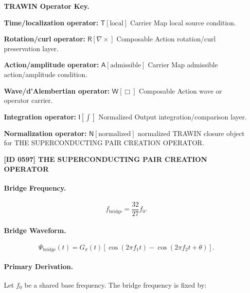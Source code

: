 \par\vspace{0.45\baselineskip}
\noindent\begin{minipage}[t]{\linewidth}
\begingroup
\small
\raggedright
\textbf{TRAWIN Operator Key.}\par
\noindent\textbf{Time/localization operator:} $\mathsf{T}\!\left[\mathrm{local}\right]$ Carrier Map local source condition.\par
\noindent\textbf{Rotation/curl operator:} $\mathsf{R}\!\left[\nabla\times\right]$ Composable Action rotation/curl preservation layer.\par
\noindent\textbf{Action/amplitude operator:} $\mathsf{A}\!\left[\mathrm{admissible}\right]$ Carrier Map admissible action/amplitude condition.\par
\noindent\textbf{Wave/d'Alembertian operator:} $\mathsf{W}\!\left[\Box\right]$ Composable Action wave or operator carrier.\par
\noindent\textbf{Integration operator:} $\mathsf{I}\!\left[\int\right]$ Normalized Output integration/comparison layer.\par
\noindent\textbf{Normalization operator:} $\mathsf{N}\!\left[\mathrm{normalized}\right]$ normalized TRAWIN closure object for THE SUPERCONDUCTING PAIR CREATION OPERATOR.\par
\endgroup
\end{minipage}

\clearpage
\noindent\textbf{[ID 0597] THE SUPERCONDUCTING PAIR CREATION OPERATOR}\par
\vspace{0.35em}
\paragraph{Bridge Frequency.}
\begin{equation}
f_{\mathrm{bridge}}=\frac{32}{27}f_0.
\end{equation}

\paragraph{Bridge Waveform.}
\begin{equation}
\Psi_{\mathrm{bridge}}(t)
=
G_{\sigma}(t)
\left[
\cos(2\pi f_1t)
-
\cos(2\pi f_2t+\theta)
\right].
\end{equation}

\paragraph{Primary Derivation.}
Let $f_0$ be a shared base frequency.  
The bridge frequency is fixed by:

